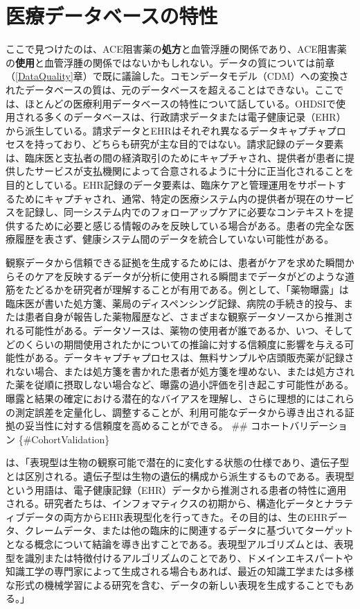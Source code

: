 \documentclass[
  11pt]{book}
\theoremstyle{definition}
\theoremstyle{definition}
\theoremstyle{definition}
\theoremstyle{definition}
\theoremstyle{remark}
\begin{document}
\section{医療データベースの特性}\label{CharacteristicsOfDatabase}

ここで見つけたのは、ACE阻害薬の\textbf{処方}と血管浮腫の関係であり、ACE阻害薬の\textbf{使用}と血管浮腫の関係ではないかもしれない。データの質については前章（\ref{DataQuality}章）で既に議論した。コモンデータモデル（CDM）への変換されたデータベースの質は、元のデータベースを超えることはできない。ここでは、ほとんどの医療利用データベースの特性について話している。OHDSIで使用される多くのデータベースは、行政請求データまたは電子健康记录（EHR）から派生している。請求データとEHRはそれぞれ異なるデータキャプチャプロセスを持っており、どちらも研究が主な目的ではない。請求記録のデータ要素は、臨床医と支払者の間の経済取引のためにキャプチャされ、提供者が患者に提供したサービスが支払機関によって合意されるように十分に正当化されることを目的としている。EHR記録のデータ要素は、臨床ケアと管理運用をサポートするためにキャプチャされ、通常、特定の医療システム内の提供者が現在のサービスを記録し、同一システム内でのフォローアップケアに必要なコンテキストを提供するために必要と感じる情報のみを反映している場合がある。患者の完全な医療履歴を表さず、健康システム間のデータを統合していない可能性がある。

観察データから信頼できる証拠を生成するためには、患者がケアを求めた瞬間からそのケアを反映するデータが分析に使用される瞬間までデータがどのような道筋をたどるかを研究者が理解することが有用である。例として、「薬物曝露」は臨床医が書いた処方箋、薬局のディスペンシング記録、病院の手続き的投与、または患者自身が報告した薬物履歴など、さまざまな観察データソースから推測される可能性がある。データソースは、薬物の使用者が誰であるか、いつ、そしてどのくらいの期間使用されたかについての推論に対する信頼度に影響を与える可能性がある。データキャプチャプロセスは、無料サンプルや店頭販売薬が記録されない場合、または処方箋を書かれた患者が処方箋を埋めない、または処方された薬を従順に摂取しない場合など、曝露の過小評価を引き起こす可能性がある。曝露と結果の確定における潜在的なバイアスを理解し、さらに理想的にはこれらの測定誤差を定量化し、調整することが、利用可能なデータから導き出される証拠の妥当性に対する信頼度を高めることができる。
\#\# コホートバリデーション \{\#CohortValidation\}

\citet{hripcsak_2017} は、「表現型は生物の観察可能で潜在的に変化する状態の仕様であり、遺伝子型とは区別される。遺伝子型は生物の遺伝的構成から派生するものである。表現型という用語は、電子健康記録（EHR）データから推測される患者の特性に適用される。研究者たちは、インフォマティクスの初期から、構造化データとナラティブデータの両方からEHR表現型化を行ってきた。その目的は、生のEHRデータ、クレームデータ、または他の臨床的に関連するデータに基づいてターゲットとなる概念について結論を導き出すことである。表現型アルゴリズムとは、表現型を識別または特徴付けるアルゴリズムのことであり、ドメインエキスパートや知識工学の専門家によって生成される場合もあれば、最近の知識工学または多様な形式の機械学習による研究を含む、データの新しい表現を生成することでもある。」
\end{document}
